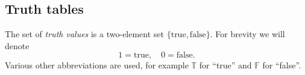 

\setcounter{section}{1}
\setcounter{subsection}{2}
\setcounter{dfn}{1}

\subsection{Truth tables}
The set of \emph{truth values} is a two-element set $\{\text{true}, \text{false}\}$.
For brevity we will denote
\[
1 = \text{true}, \quad 0 = \text{false}.
\]
Various other abbreviations are used, for example $\mathbb{T}$ for ``true'' and $\mathbb{F}$ for ``false''.


